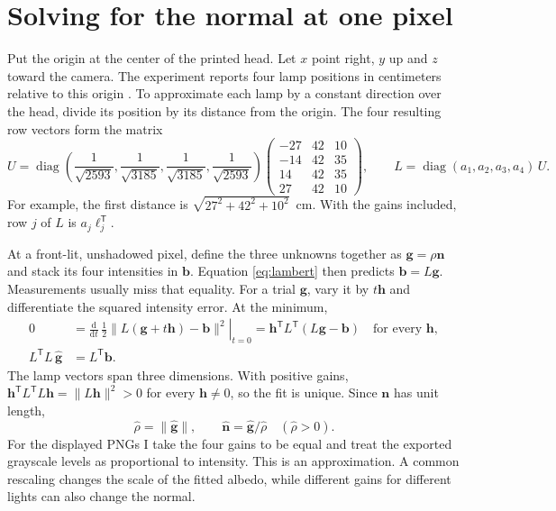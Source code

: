 \documentclass[11pt,a4paper]{article}
\numberwithin{equation}{section}
\newcommand{\dd}{\mathrm{d}}
\begin{document}
\newpage
\section{Solving for the normal at one pixel}

Put the origin at the center of the printed head. Let $x$ point right,
$y$ up and $z$ toward the camera. The experiment reports four lamp positions
in centimeters relative to this origin \cite{setup}. To approximate each
lamp by a constant direction over the head, divide its position by its
distance from the origin. The four resulting row vectors form the matrix
\begin{equation}
 U=
 \operatorname{diag}\!\left(
 \frac{1}{\sqrt{2593}},\frac{1}{\sqrt{3185}},
 \frac{1}{\sqrt{3185}},\frac{1}{\sqrt{2593}}\right)
 \begin{pmatrix}
 -27&42&10\\ -14&42&35\\ 14&42&35\\ 27&42&10
 \end{pmatrix},\qquad
 L=\operatorname{diag}(a_1,a_2,a_3,a_4)\,U .
 \label{eq:measured-lights}
\end{equation}
For example, the first distance is $\sqrt{27^2+42^2+10^2}$~cm.
With the gains included, row $j$ of $L$ is $a_j\boldsymbol\ell_j^\mathsf T$.

At a front-lit, unshadowed pixel, define the three unknowns together as
$\mathbf g=\rho\mathbf n$ and stack its four intensities in $\mathbf b$.
Equation \eqref{eq:lambert} then predicts $\mathbf b=L\mathbf g$.
Measurements usually miss that equality. For a trial $\mathbf g$, vary it by
$t\mathbf h$ and differentiate the squared intensity error. At the minimum,
\begin{align}
 0&=\left.\frac{\dd}{\dd t}\,
      \tfrac12\|L(\mathbf g+t\mathbf h)-\mathbf b\|^2\right|_{t=0}
   =\mathbf h^\mathsf T L^\mathsf T(L\mathbf g-\mathbf b)
   \quad\text{for every }\mathbf h ,\nonumber\\
 L^\mathsf TL\,\widehat{\mathbf g}&=L^\mathsf T\mathbf b .
 \label{eq:photo-normal}
\end{align}
The lamp vectors span three dimensions. With positive gains,
$\mathbf h^\mathsf TL^\mathsf TL\mathbf h=\|L\mathbf h\|^2>0$ for every
$\mathbf h\ne0$, so the fit is unique. Since $\mathbf n$ has unit length,
\begin{equation}
 \widehat\rho=\|\widehat{\mathbf g}\|,\qquad
 \widehat{\mathbf n}=\widehat{\mathbf g}/\widehat\rho
 \quad(\widehat\rho>0).
 \label{eq:photo-albedo}
\end{equation}
For the displayed PNGs I take the four gains to be equal and treat the
exported grayscale levels as proportional to intensity. This is an
approximation. A common rescaling changes the scale of the fitted albedo,
while different gains for different lights can also change the normal.
\end{document}
